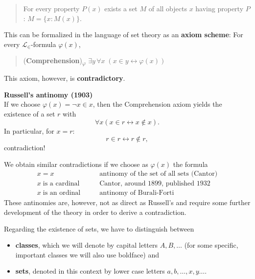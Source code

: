 \begin{quote}
For every property $P(x)$ exists a set $M$ of all objects $x$ having property $P$:  $M =\{x: M(x) \}$.
\end{quote}

This can be formalized in the language of set theory as an \textbf{axiom scheme}: For every $\mathcal{L}_\in$-formula $\varphi(x)$,

\begin{quote}
(\textbf{Comprehension})\textsubscript{$\varphi$} $\exists y \, \forall x \; ( x \in y \leftrightarrow \varphi(x))$
\end{quote}

This axiom, however, is \textbf{contradictory}.

\begin{framed}
\textbf{Russell's antinomy (1903)}\\
If we choose $\varphi(x) = \neg x \in x$, then the Comprehension axiom yields the existence of a set $r$ with
\begin{equation*}
\forall x ( x \in  r \leftrightarrow x \not \in x).
\end{equation*}
In particular, for $x = r$:
\begin{equation*}
r \in  r \leftrightarrow r \not \in r ,
\end{equation*}
contradiction!
\end{framed}

We obtain similar contradictions if we choose as $\varphi(x)$ the formula
\begin{align*}
     x = x  \qquad &  \text{antinomy of the set of all sets (Cantor)} \\
     x\;\text{is a cardinal} \qquad & \text{Cantor, around 1899, published 1932}\\
     x \; \text{is an ordinal} \qquad &   \text{antinomy of Burali-Forti}
\end{align*}
These antinomies are, however, not as direct as Russell's and require some further development of the theory in order to derive a contradiction.

Regarding the existence of sets, we have to distinguish between

\begin{itemize}
\item \textbf{classes}, which we will denote by capital letters $A,B,\dots$ (for some specific, important classes we will also use boldface) and
\item \textbf{sets}, denoted in this context by lower case letters $a,b,\ldots,x,y \ldots$.
\end{itemize}

